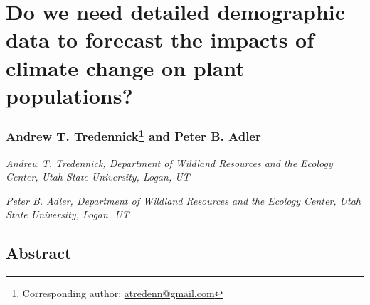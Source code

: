 \documentclass[12pt,]{article}
\author{}
\date{}
\begin{document}
\normalsize


\section{Do we need detailed demographic data to forecast the impacts of
climate change on plant
populations?}\label{do-we-need-detailed-demographic-data-to-forecast-the-impacts-of-climate-change-on-plant-populations}

\subsubsection[Andrew T. Tredennick and Peter B. Adler]{Andrew T.
Tredennick\footnote{Corresponding author:
  \href{mailto:atredenn@gmail.com}{\href{mailto:atredenn@gmail.com}{atredenn@gmail.com}}}
and Peter B.
Adler}\label{andrew-t.-tredennickcorrauth-and-peter-b.-adler}

\emph{Andrew T. Tredennick, Department of Wildland Resources and the
Ecology Center, Utah State University, Logan, UT}

\emph{Peter B. Adler, Department of Wildland Resources and the Ecology
Center, Utah State University, Logan, UT}

\subsection{Abstract}\label{abstract}
\end{document}

